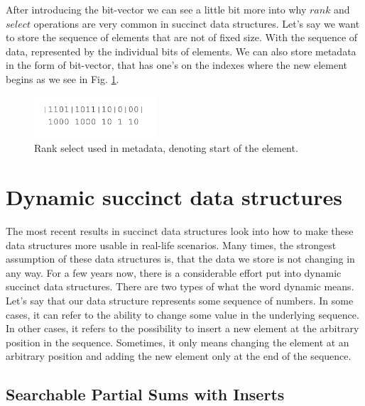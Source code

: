 After introducing the bit-vector we can see a little bit more into why $rank$ and $select$ operations are very common in succinct data structures. Let's say we want to store the sequence of elements that are not of fixed size.
With the sequence of data, represented by the individual bits of elements. We can also store metadata in the form of bit-vector, that has one's on the indexes
where the new element begins as we see in Fig. \ref{obr:obr_rank_select}.

\begin{figure}
\centerline{\includegraphics[width=0.4\textwidth]{images/obr_rank_select}}
\caption[Rank select usage in representation of sequence of elements with different size]{Rank select used in metadata, denoting start of the element.}
\label{obr:obr_rank_select}
\end{figure}


\section{Dynamic succinct data structures}

The most recent results in succinct data structures look into how to make these data structures more usable in real-life scenarios. Many times, the
strongest assumption of these data structures is, that the data we store is not changing in any way. For a few years now, there is a considerable effort put into dynamic succinct data structures. There are two types of what the word dynamic means. Let's say that our data structure represents some sequence of numbers. In some cases, it can refer to the ability to change some value in the underlying sequence. In other cases, it refers to the possibility to insert a new element at the arbitrary position in the sequence. Sometimes, it only means changing the element at an arbitrary position and adding the new element only at the end of the sequence.

\subsection{Searchable Partial Sums with Inserts}

